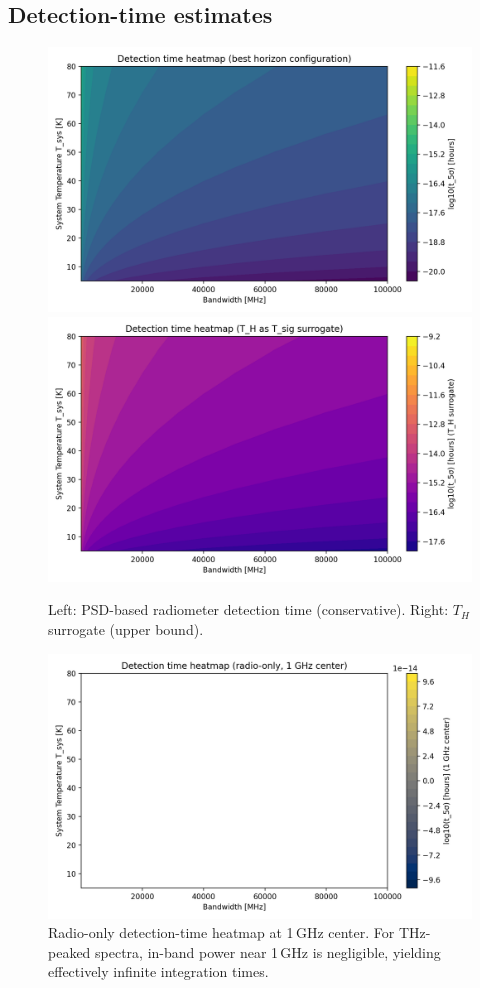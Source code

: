 \documentclass[11pt]{article}
\begin{document}
\subsection{Detection-time estimates}
\begin{figure}[h]
  \centering
  \includegraphics[width=0.48\linewidth]{figures/horizon_analysis_detection_time.png}\hfill
  \includegraphics[width=0.48\linewidth]{figures/horizon_analysis_detection_time_TH.png}
  \caption{Left: PSD-based radiometer detection time (conservative). Right: $T_H$ surrogate (upper bound).}
\end{figure}

\begin{figure}[h]
  \centering
  \includegraphics[width=0.7\linewidth]{figures/horizon_analysis_detection_time_radio.png}
  \caption{Radio-only detection-time heatmap at 1\,GHz center. For THz-peaked spectra, in-band power near 1\,GHz is negligible, yielding effectively infinite integration times.}
\end{figure}
\end{document}
